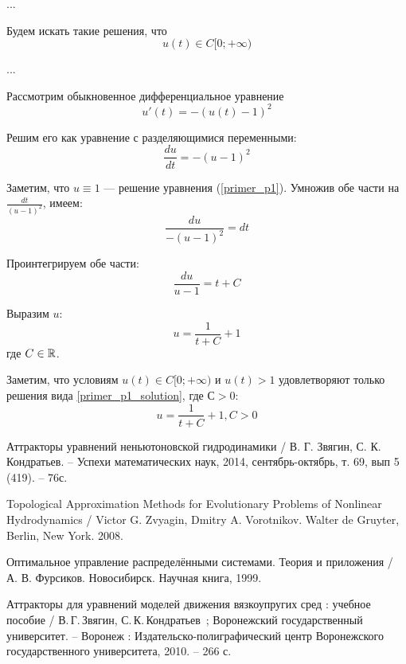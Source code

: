 ...

Будем искать такие решения, что
\begin{equation}
	u(t) \in C[0; +\infty)
\end{equation}


...

Рассмотрим обыкновенное дифференциальное уравнение
\begin{equation}\label{primer_p1}
	u'(t)=-(u(t)-1)^2
\end{equation}

Решим его как уравнение с разделяющимися переменными:
$$
	\frac{du}{dt}=-(u-1)^2
$$

Заметим, что $u\equiv 1$ --- решение уравнения (\ref{primer_p1}).
Умножив обе части на $\frac{dt}{(u-1)^2}$, имеем:
$$
	\frac{du}{-(u-1)^2}=dt
$$

Проинтегрируем обе части:
$$
	\frac{du}{u-1}=t+C
$$

Выразим $u$:
\begin{equation}\label{primer_p1_solution}
	u=\frac{1}{t+C}+1
\end{equation}
где $C\in\mathbb{R}$.

Заметим, что условиям $u(t) \in C[0; +\infty)$ и $u(t)>1$ удовлетворяют только решения вида \ref{primer_p1_solution}, где $С>0$:
\begin{equation}
	u=\frac{1}{t+C}+1, C>0
\end{equation}


\begin{thebibliography}{99}

 Аттракторы уравнений неньютоновской гидродинамики / В. Г. Звягин, С. К. Кондратьев. – Успехи математических наук, 2014, сентябрь-октябрь, т. 69, вып 5 (419). – 76с.

 Topological Approximation Methods for Evolutionary Problems of Nonlinear Hydrodynamics / Victor G. Zvyagin, Dmitry A. Vorotnikov. Walter de Gruyter, Berlin, New York. 2008.

 Оптимальное управление распределёнными системами. Теория и приложения / А. В. Фурсиков. Новосибирск. Научная книга, 1999.

 Аттракторы для уравнений моделей движения вязкоупругих сред : учебное пособие / В.\,Г.\,Звягин, С.\,К.\,Кондратьев~; Воронежский государственный университет. -- Воронеж : Издательско-полиграфический центр Воронежского государственного университета, 2010. -- 266 с.


\end{thebibliography}



